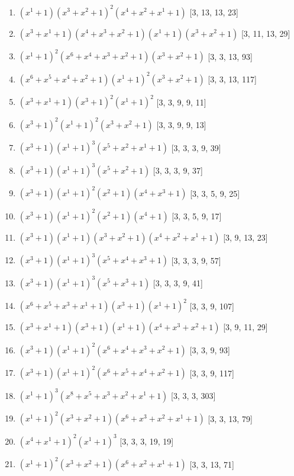 \documentclass[10pt,twocolumn]{article}
\begin{document}
\begin{enumerate}
\item $(x^{1} + 1)(x^{3} + x^{2} + 1)^{2}(x^{4} + x^{2} + x^{1} + 1)$  [3, 13, 13, 23]
\item $(x^{3} + x^{1} + 1)(x^{4} + x^{3} + x^{2} + 1)(x^{1} + 1)(x^{3} + x^{2} + 1)$  [3, 11, 13, 29]
\item $(x^{1} + 1)^{2}(x^{6} + x^{4} + x^{3} + x^{2} + 1)(x^{3} + x^{2} + 1)$  [3, 3, 13, 93]
\item $(x^{6} + x^{5} + x^{4} + x^{2} + 1)(x^{1} + 1)^{2}(x^{3} + x^{2} + 1)$  [3, 3, 13, 117]
\item $(x^{3} + x^{1} + 1)(x^{3} + 1)^{2}(x^{1} + 1)^{2}$  [3, 3, 9, 9, 11]
\item $(x^{3} + 1)^{2}(x^{1} + 1)^{2}(x^{3} + x^{2} + 1)$  [3, 3, 9, 9, 13]
\item $(x^{3} + 1)(x^{1} + 1)^{3}(x^{5} + x^{2} + x^{1} + 1)$  [3, 3, 3, 9, 39]
\item $(x^{3} + 1)(x^{1} + 1)^{3}(x^{5} + x^{2} + 1)$  [3, 3, 3, 9, 37]
\item $(x^{3} + 1)(x^{1} + 1)^{2}(x^{2} + 1)(x^{4} + x^{3} + 1)$  [3, 3, 5, 9, 25]
\item $(x^{3} + 1)(x^{1} + 1)^{2}(x^{2} + 1)(x^{4} + 1)$  [3, 3, 5, 9, 17]
\item $(x^{3} + 1)(x^{1} + 1)(x^{3} + x^{2} + 1)(x^{4} + x^{2} + x^{1} + 1)$  [3, 9, 13, 23]
\item $(x^{3} + 1)(x^{1} + 1)^{3}(x^{5} + x^{4} + x^{3} + 1)$  [3, 3, 3, 9, 57]
\item $(x^{3} + 1)(x^{1} + 1)^{3}(x^{5} + x^{3} + 1)$  [3, 3, 3, 9, 41]
\item $(x^{6} + x^{5} + x^{3} + x^{1} + 1)(x^{3} + 1)(x^{1} + 1)^{2}$  [3, 3, 9, 107]
\item $(x^{3} + x^{1} + 1)(x^{3} + 1)(x^{1} + 1)(x^{4} + x^{3} + x^{2} + 1)$  [3, 9, 11, 29]
\item $(x^{3} + 1)(x^{1} + 1)^{2}(x^{6} + x^{4} + x^{3} + x^{2} + 1)$  [3, 3, 9, 93]
\item $(x^{3} + 1)(x^{1} + 1)^{2}(x^{6} + x^{5} + x^{4} + x^{2} + 1)$  [3, 3, 9, 117]
\item $(x^{1} + 1)^{3}(x^{8} + x^{5} + x^{3} + x^{2} + x^{1} + 1)$  [3, 3, 3, 303]
\item $(x^{1} + 1)^{2}(x^{3} + x^{2} + 1)(x^{6} + x^{3} + x^{2} + x^{1} + 1)$  [3, 3, 13, 79]
\item $(x^{4} + x^{1} + 1)^{2}(x^{1} + 1)^{3}$  [3, 3, 3, 19, 19]
\item $(x^{1} + 1)^{2}(x^{3} + x^{2} + 1)(x^{6} + x^{2} + x^{1} + 1)$  [3, 3, 13, 71]

\end{enumerate}
\end{document}
